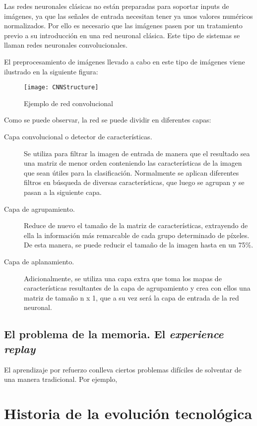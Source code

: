 \documentclass[11pt,spanish,listoffigures,listoftables]{tfgetsinf}
\begin{document}
Las redes neuronales clásicas no están preparadas para soportar inputs de imágenes, ya que las señales de entrada necesitan tener ya unos valores numéricos normalizados. Por ello es necesario que las imágenes pasen por un tratamiento previo a su introducción en una red neuronal clásica. Este tipo de sistemas se llaman redes neuronales convolucionales.

El preprocesamiento de imágenes llevado a cabo en este tipo de imágenes viene ilustrado en la siguiente figura:

\begin{figure}[h]
	\centering
	\texttt{[image: CNNStructure]}
	\caption{Ejemplo de red convolucional}
	
\end{figure}

Como se puede observar, la red se puede dividir en diferentes capas:

\begin{description}
	\item[Capa convolucional o detector de características.] Se utiliza para filtrar la imagen de entrada de manera que el resultado sea una matriz de menor orden conteniendo las características de la imagen que sean útiles para la clasificación. Normalmente se aplican diferentes filtros en búsqueda de diversas características, que luego se agrupan y se pasan a la siguiente capa.
	\item [Capa de agrupamiento.] Reduce de nuevo el tamaño de la matriz de características, extrayendo de ella la información más remarcable de cada grupo determinado de píxeles. De esta manera, se puede reducir el tamaño de la imagen hasta en un 75\%.
	\item[Capa de aplanamiento.] Adicionalmente, se utiliza una capa extra que toma los mapas de características resultantes de la capa de agrupamiento y crea con ellos una matriz de tamaño n x 1, que a su vez será la capa de entrada de la red neuronal.
\end{description}

\subsection{El problema de la memoria. El \textit{experience replay}}

El aprendizaje por refuerzo conlleva ciertos problemas difíciles de solventar de una manera tradicional. Por ejemplo, 


\section{Historia de la evolución tecnológica}
\end{document}
